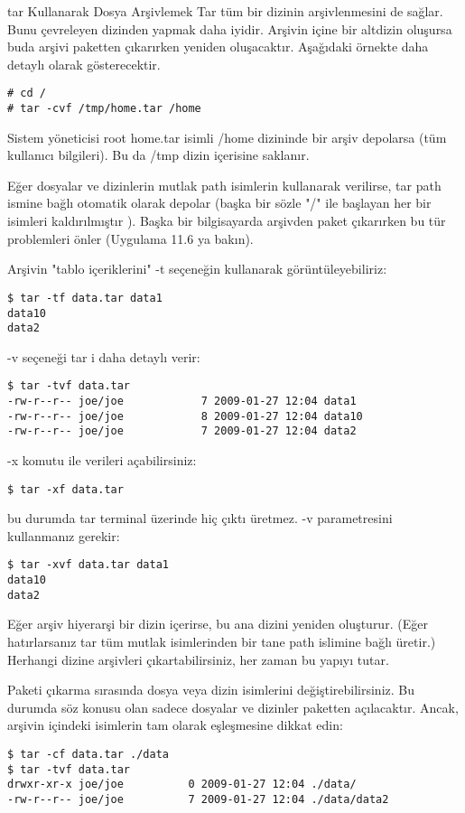 \begin{section}{tar Kullanarak Dosya Arşivlemek}
Tar tüm bir dizinin arşivlenmesini de sağlar. Bunu çevreleyen dizinden yapmak daha iyidir. Arşivin içine bir altdizin oluşursa buda arşivi paketten çıkarırken yeniden oluşacaktır. Aşağıdaki örnekte daha detaylı olarak gösterecektir.
\begin{verbatim}
# cd /
# tar -cvf /tmp/home.tar /home
\end{verbatim}


Sistem yöneticisi root home.tar isimli /home dizininde bir arşiv depolarsa (tüm kullanıcı bilgileri). Bu da /tmp dizin içerisine saklanır.

Eğer dosyalar ve dizinlerin mutlak path isimlerin kullanarak verilirse, tar path
ismine bağlı otomatik olarak depolar (başka bir sözle "/" ile başlayan her bir
isimleri kaldırılmıştır ). Başka bir bilgisayarda arşivden paket çıkarırken bu tür
problemleri önler (Uygulama 11.6 ya bakın).

Arşivin "tablo içeriklerini" -t seçeneğin kullanarak görüntüleyebiliriz:
\begin{verbatim}
$ tar -tf data.tar data1
data10
data2
\end{verbatim}

-v seçeneği tar i daha detaylı verir:
\begin{verbatim}
$ tar -tvf data.tar
-rw-r--r-- joe/joe            7 2009-01-27 12:04 data1
-rw-r--r-- joe/joe            8 2009-01-27 12:04 data10
-rw-r--r-- joe/joe            7 2009-01-27 12:04 data2
\end{verbatim}

-x komutu ile verileri açabilirsiniz:
\begin{verbatim}
$ tar -xf data.tar
\end{verbatim}
bu durumda tar terminal üzerinde hiç çıktı üretmez. -v parametresini kullanmanız gerekir:
\begin{verbatim}
$ tar -xvf data.tar data1
data10
data2
\end{verbatim}

Eğer arşiv hiyerarşi bir dizin içerirse, bu ana dizini yeniden oluşturur. (Eğer hatırlarsanız tar tüm mutlak isimlerinden bir tane path islimine bağlı üretir.) Herhangi dizine arşivleri çıkartabilirsiniz, her zaman bu yapıyı tutar.

Paketi çıkarma sırasında dosya veya dizin isimlerini değiştirebilirsiniz. Bu durumda söz konusu olan sadece dosyalar ve dizinler paketten açılacaktır. Ancak, arşivin içindeki isimlerin tam olarak eşleşmesine dikkat edin:
\begin{verbatim}
$ tar -cf data.tar ./data 
$ tar -tvf data.tar
drwxr-xr-x joe/joe          0 2009-01-27 12:04 ./data/
-rw-r--r-- joe/joe          7 2009-01-27 12:04 ./data/data2


\end{verbatim}
\end{section}
